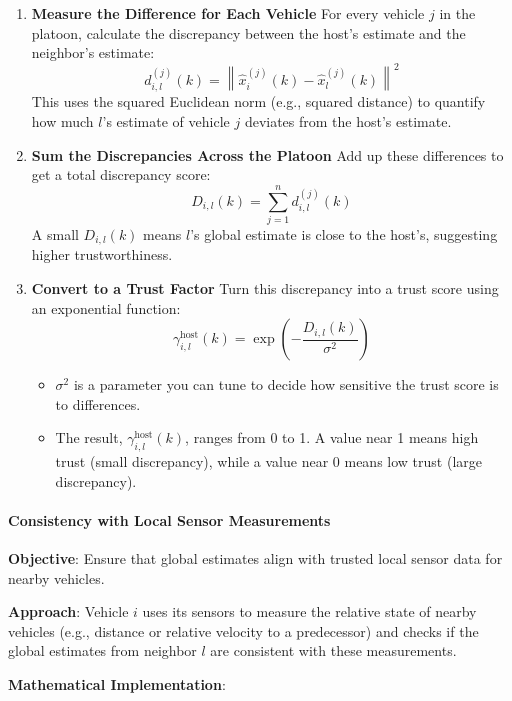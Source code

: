 \documentclass[letterpaper, 10pt, conference]{ieeeconf}  %
\begin{document}
\begin{enumerate}
    \item \textbf{Measure the Difference for Each Vehicle}  
    For every vehicle \( j \) in the platoon, calculate the discrepancy between the host's estimate and the neighbor's estimate:
    \[
    d_{i,l}^{(j)}(k) = \left\| \hat{x}_i^{(j)}(k) - \hat{x}_l^{(j)}(k) \right\|^2
    \]
    This uses the squared Euclidean norm (e.g., squared distance) to quantify how much \( l \)'s estimate of vehicle \( j \) deviates from the host's estimate.

    \item \textbf{Sum the Discrepancies Across the Platoon}  
    Add up these differences to get a total discrepancy score:
    \[
    D_{i,l}(k) = \sum_{j=1}^n d_{i,l}^{(j)}(k)
    \]
    A small \( D_{i,l}(k) \) means \( l \)'s global estimate is close to the host's, suggesting higher trustworthiness.

    \item \textbf{Convert to a Trust Factor}  
    Turn this discrepancy into a trust score using an exponential function:
    \[
    \gamma_{i,l}^{\text{host}}(k) = \exp\left( -\frac{D_{i,l}(k)}{\sigma^2} \right)
    \]
    \begin{itemize}
        \item \( \sigma^2 \) is a parameter you can tune to decide how sensitive the trust score is to differences.
        \item The result, \( \gamma_{i,l}^{\text{host}}(k) \), ranges from 0 to 1. A value near 1 means high trust (small discrepancy), while a value near 0 means low trust (large discrepancy).
    \end{itemize}
\end{enumerate}
\paragraph{Consistency with Local Sensor Measurements}
\textbf{Objective}: Ensure that global estimates align with trusted local sensor data for nearby vehicles.

\textbf{Approach}: Vehicle \( i \) uses its sensors to measure the relative state of nearby vehicles (e.g., distance or relative velocity to a predecessor) and checks if the global estimates from neighbor \( l \) are consistent with these measurements.

\textbf{Mathematical Implementation}:
\end{document}
